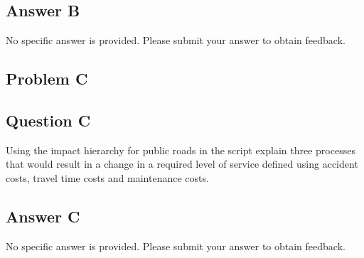 \subsection{Answer B}
No specific answer is provided. Please submit your answer to obtain feedback. 
\subsection{Problem C}
\subsection{Question C}
Using the impact hierarchy for public roads in the script explain three processes that would result in a change in a required level of service defined using accident costs, travel time costs and maintenance costs. 
\subsection{Answer C}
No specific answer is provided. Please submit your answer to obtain feedback. 
%



